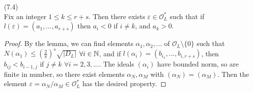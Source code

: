 \documentclass[a4paper]{article}
\begin{document}
\begin{coro} (7.4)\\
Fix an integer $1 \leq k \leq r+s$. Then there exists $\varepsilon \in \mathcal{O}_L^*$ such that if $l(\varepsilon) = (a_1,...,a_{r+s})$ then $a_i < 0$ if $i \neq k$, and $a_k > 0$.
\begin{proof}
By the lemma, we can find elements $\alpha_1,\alpha_2,...$ of $\mathcal{O}_L\setminus \{0\}$ such that $N(\alpha_1) \leq (\frac{2}{\pi})^s \sqrt{|D_L|}$ $\forall i \in \mathbb{N}$, and if $l(\alpha_i) = (b_{i_1},...,b_{i,r+s})$, then $b_{ij} < b_{i-1,j}$ if $j \neq k$ $\forall i = 2,3,...$. The ideals $(\alpha_i)$ have bounded norm, so are finite in number, so there exist elements $\alpha_N, \alpha_M$ with $(\alpha_N) = (\alpha_M)$. Then the element $\varepsilon = \alpha_N/\alpha_M \in \mathcal{O}_L^*$ has the desired property.
\end{proof}
\end{coro}

\iffalse
\begin{equation*}
\begin{aligned}

\end{aligned}
\end{equation*}
\fi
\end{document}
